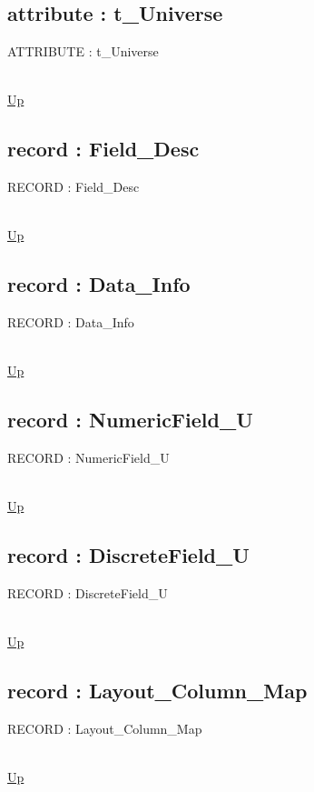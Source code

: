\subsection*{attribute : t\_Universe}
\hypertarget{ecldoc:logisticregression.types.t_universe}{ATTRIBUTE : t\_Universe} \\
\hyperlink{ecldoc:LogisticRegression.Types}{Up} \\
\par
\subsection*{record : Field\_Desc}
\hypertarget{ecldoc:logisticregression.types.field_desc}{RECORD : Field\_Desc} \\
\hyperlink{ecldoc:LogisticRegression.Types}{Up} \\
\par
\subsection*{record : Data\_Info}
\hypertarget{ecldoc:logisticregression.types.data_info}{RECORD : Data\_Info} \\
\hyperlink{ecldoc:LogisticRegression.Types}{Up} \\
\par
\subsection*{record : NumericField\_U}
\hypertarget{ecldoc:logisticregression.types.numericfield_u}{RECORD : NumericField\_U} \\
\hyperlink{ecldoc:LogisticRegression.Types}{Up} \\
\par
\subsection*{record : DiscreteField\_U}
\hypertarget{ecldoc:logisticregression.types.discretefield_u}{RECORD : DiscreteField\_U} \\
\hyperlink{ecldoc:LogisticRegression.Types}{Up} \\
\par
\subsection*{record : Layout\_Column\_Map}
\hypertarget{ecldoc:logisticregression.types.layout_column_map}{RECORD : Layout\_Column\_Map} \\
\hyperlink{ecldoc:LogisticRegression.Types}{Up} \\
\par
